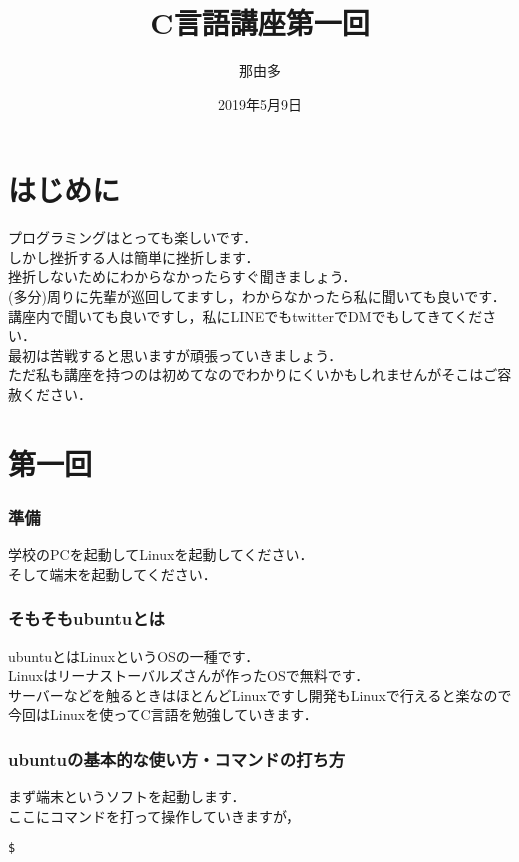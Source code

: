 \documentclass[a4j,titlepage,dvipdfmx]{jsarticle}   %
\title{C言語講座第一回}
\author{那由多}
\date{2019年5月9日}
\begin{document}
\maketitle
\part{はじめに}
{\Large プログラミングはとっても楽しいです．\\}
しかし挫折する人は簡単に挫折します．\\
挫折しないためにわからなかったらすぐ聞きましょう．\\
(多分)周りに先輩が巡回してますし，わからなかったら私に聞いても良いです．\\
講座内で聞いても良いですし，私にLINEでもtwitterでDMでもしてきてください．\\
最初は苦戦すると思いますが頑張っていきましょう．\\
ただ私も講座を持つのは初めてなのでわかりにくいかもしれませんがそこはご容赦ください．\\
\part{第一回}
\section{準備}
学校のPCを起動してLinuxを起動してください．\\
そして端末を起動してください．\\

\section{そもそもubuntuとは}
ubuntuとはLinuxというOSの一種です．\\
Linuxはリーナストーバルズさんが作ったOSで無料です．\\
サーバーなどを触るときはほとんどLinuxですし開発もLinuxで行えると楽なので今回はLinuxを使ってC言語を勉強していきます．\\
\section{ubuntuの基本的な使い方・コマンドの打ち方}
まず端末というソフトを起動します．\\
ここにコマンドを打って操作していきますが，
\begin{lstlisting}
$
\end{lstlisting}
\end{document}
